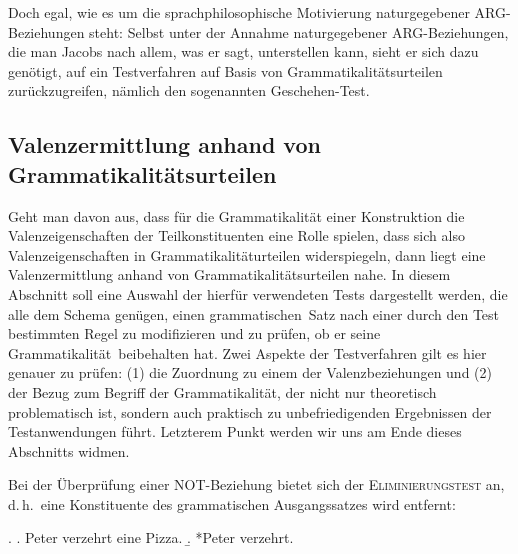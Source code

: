 Doch egal, wie es um die sprachphilosophische Motivierung naturgegebener ARG-Bezie\-hun\-gen steht: Selbst unter der Annahme naturgegebener ARG-Bezie\-hun\-gen, die man Jacobs nach allem, was er sagt, unterstellen kann, sieht er sich dazu genötigt, auf ein Testverfahren auf Basis von Grammatikalitätsurteilen zurückzugreifen, nämlich den sogenannten Geschehen-Test.           



\subsection{Valenzermittlung anhand von Grammatikalitäts\-ur\-teilen} \label{sec-valenzermittlung-sprecherbefragung}

Geht man davon aus, dass für die Grammatikalität einer Konstruktion die Valenz\-eigenschaften der Teilkonstituenten eine Rolle spielen, dass sich also Valenzeigenschaften in Grammatikalitäturteilen widerspiegeln, dann liegt eine Valenzermittlung anhand von Grammatikalitätsurteilen nahe. In diesem Abschnitt soll eine Auswahl der hierfür verwendeten Tests dargestellt werden, die alle dem Schema genügen, einen \glqq grammatischen\grqq\ Satz nach einer durch den Test bestimmten Regel zu modifizieren und zu prüfen, ob er seine \glqq Grammatikalität\grqq\ beibehalten hat. Zwei Aspekte der Testverfahren gilt es hier genauer zu prüfen: (1) die Zuordnung zu einem der Valenzbeziehungen und (2) der Bezug zum Begriff der Grammatikalität, der nicht nur theoretisch problematisch ist, sondern auch praktisch zu unbefriedigenden Ergebnissen der Testanwendungen führt. Letzterem Punkt werden wir uns am Ende dieses Abschnitts widmen.%

Bei der Überprüfung einer NOT-Beziehung bietet sich der \textsc{Eliminierungstest} an, d.\,h.\ eine Konstituente des grammatischen Ausgangssatzes wird entfernt:  

\ex. 
\a. Peter verzehrt eine Pizza.
\b. *Peter verzehrt.

